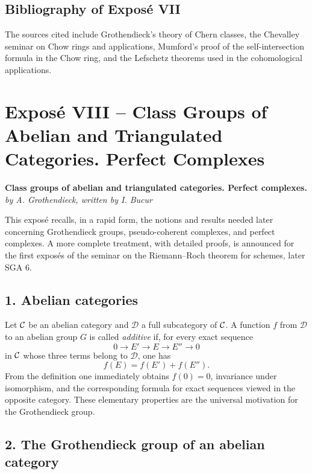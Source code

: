 \documentclass[11pt]{article}
\theoremstyle{plain}
\theoremstyle{definition}
\theoremstyle{remark}
\newcommand{\cD}{\mathcal D}\newcommand{\cE}{\mathcal E}\newcommand{\cF}{\mathcal F}
\begin{document}
\subsection*{Bibliography of Expos\'e VII}

The sources cited include Grothendieck's theory of Chern classes, the Chevalley seminar on Chow rings and applications, Mumford's proof of the self-intersection formula in the Chow ring, and the Lefschetz theorems used in the cohomological applications.

\newpage

\section*{Expos\'e VIII -- Class Groups of Abelian and Triangulated Categories. Perfect Complexes}

\begin{center}
\textbf{Class groups of abelian and triangulated categories. Perfect complexes.}\\
\emph{by A. Grothendieck, written by I. Bucur}
\end{center}

This expos\'e recalls, in a rapid form, the notions and results needed later concerning Grothendieck groups, pseudo-coherent complexes, and perfect complexes. A more complete treatment, with detailed proofs, is announced for the first expos\'es of the seminar on the Riemann--Roch theorem for schemes, later SGA 6.

\subsection*{1. Abelian categories}

Let $\mathcal C$ be an abelian category and $\cD$ a full subcategory of $\mathcal C$. A function $f$ from $\cD$ to an abelian group $G$ is called \emph{additive} if, for every exact sequence
\[
   0\to E'\to E\to E''\to0
\]
in $\mathcal C$ whose three terms belong to $\cD$, one has
\[
   f(E)=f(E')+f(E'').
\]
From the definition one immediately obtains $f(0)=0$, invariance under isomorphism, and the corresponding formula for exact sequences viewed in the opposite category. These elementary properties are the universal motivation for the Grothendieck group.

\subsection*{2. The Grothendieck group of an abelian category}
\end{document}
